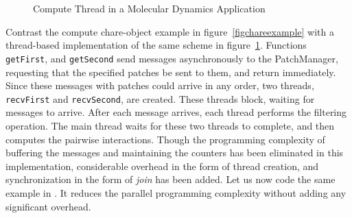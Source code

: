 \begin{figure}
\begin{center}
\end{center}
\caption{Compute Thread in a Molecular Dynamics Application}
\label{figthreadexample}
\end{figure}


Contrast the compute chare-object example in
figure~\ref{figchareexample} with a thread-based implementation of the
same scheme in figure~\ref{figthreadexample}. Functions {\tt
getFirst}, and {\tt getSecond} send messages asynchronously to the
PatchManager, requesting that the specified patches be sent to them,
and return immediately. Since these messages with patches could arrive
in any order, two threads, {\tt recvFirst} and {\tt recvSecond}, are
created. These threads block, waiting for messages to arrive. After
each message arrives, each thread performs the filtering
operation. The main thread waits for these two threads to complete,
and then computes the pairwise interactions. Though the programming
complexity of buffering the messages and maintaining the counters has
been eliminated in this implementation, considerable overhead in the
form of thread creation, and synchronization in the form of {\em join}
has been added. Let us now code the same example in \sdag. It reduces the
parallel programming complexity without adding any significant
overhead.

